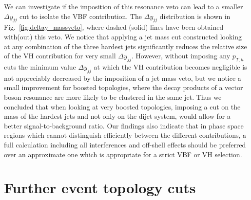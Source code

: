 \documentclass[10pt,prd,fleqn,superscriptaddress,notitlepage,nofootinbib,preprintnumbers,nobalancelastpage]{revtex4-1}
\newcommand{\VBF}{VBF\xspace}
\newcommand{\VH}{VH\xspace}
\begin{document}
We can investigate if the imposition of this resonance veto can lead to a smaller $\Delta y_{jj}$ cut to isolate the \VBF{} contribution.
The $\Delta y_{jj}$ distribution is shown in Fig.~\ref{fig:deltay_massveto}, where dashed (solid) lines have been obtained with(out) this veto.
We notice that applying a jet mass cut constructed looking at any combination of the three hardest jets significantly reduces the relative size of the \VH{} contribution for very small $\Delta y_{jj}$. However, without imposing any $p_{T,h}$ cuts the minimum value $\Delta y_{jj}$ at which the \VH{} contribution becomes negligible is not appreciably decreased by  the imposition of a jet mass veto, but we notice a small improvement for boosted topologies, where the decay products of a vector boson resonance are more likely to be clustered in the same jet.
Thus we concluded that when looking at very boosted topologies, imposing a cut on the mass of the hardest jets and not only on the dijet system, would allow for a better signal-to-background ratio. Our findings also indicate that in phase space regions which cannot distinguish efficiently between the different contributions, a full calculation including all interferences and off-shell effects should be preferred over an approximate one which is appropriate for a strict VBF or VH selection.

\section{Further event topology cuts}
\label{sec:topology}
\end{document}
